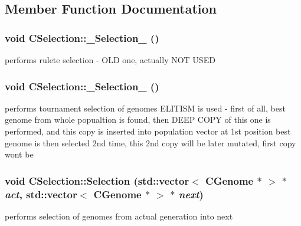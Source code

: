 \subsection{Member Function Documentation}
\hypertarget{classCSelection_aad9d7729f69f7069f16d1e6d67fd95af}{
\subsubsection[{\_\-Selection\_\-01}]{\setlength{\rightskip}{0pt plus 5cm}void CSelection::\_\-Selection\_ ()}}
\label{classCSelection_aad9d7729f69f7069f16d1e6d67fd95af}
performs rulete selection -\/ OLD one, actually NOT USED \hypertarget{classCSelection_a5f042b58f50bf7713fb9160fe3929c32}{
\subsubsection[{\_\-Selection\_\-02}]{\setlength{\rightskip}{0pt plus 5cm}void CSelection::\_\-Selection\_ ()}}
\label{classCSelection_a5f042b58f50bf7713fb9160fe3929c32}
performs tournament selection of genomes ELITISM is used -\/ first of all, best genome from whole popualtion is found, then DEEP COPY of this one is performed, and this copy is inserted into population vector at 1st position best genome is then selected 2nd time, this 2nd copy will be later mutated, first copy wont be \hypertarget{classCSelection_a1881ca413690f15e11e304f329f4fa4a}{
\subsubsection[{Selection}]{\setlength{\rightskip}{0pt plus 5cm}void CSelection::Selection (std::vector$<$ {\bf CGenome} $\ast$ $>$ $\ast$ {\em act}, \/  std::vector$<$ {\bf CGenome} $\ast$ $>$ $\ast$ {\em next})}}
\label{classCSelection_a1881ca413690f15e11e304f329f4fa4a}
performs selection of genomes from actual generation into next


